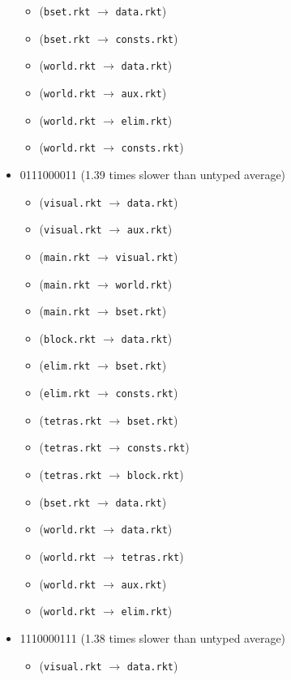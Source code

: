 \documentclass{article}
\newcommand{\mono}[1]{\texttt{#1}}
\begin{document}
\begin{itemize}
\begin{itemize}
  \item (\mono{bset.rkt} $\rightarrow$ \mono{data.rkt})
  \item (\mono{bset.rkt} $\rightarrow$ \mono{consts.rkt})
  \item (\mono{world.rkt} $\rightarrow$ \mono{data.rkt})
  \item (\mono{world.rkt} $\rightarrow$ \mono{aux.rkt})
  \item (\mono{world.rkt} $\rightarrow$ \mono{elim.rkt})
  \item (\mono{world.rkt} $\rightarrow$ \mono{consts.rkt})
  \end{itemize}
\item 0111000011 (1.39 times slower than untyped average)
  \begin{itemize}
  \item (\mono{visual.rkt} $\rightarrow$ \mono{data.rkt})
  \item (\mono{visual.rkt} $\rightarrow$ \mono{aux.rkt})
  \item (\mono{main.rkt} $\rightarrow$ \mono{visual.rkt})
  \item (\mono{main.rkt} $\rightarrow$ \mono{world.rkt})
  \item (\mono{main.rkt} $\rightarrow$ \mono{bset.rkt})
  \item (\mono{block.rkt} $\rightarrow$ \mono{data.rkt})
  \item (\mono{elim.rkt} $\rightarrow$ \mono{bset.rkt})
  \item (\mono{elim.rkt} $\rightarrow$ \mono{consts.rkt})
  \item (\mono{tetras.rkt} $\rightarrow$ \mono{bset.rkt})
  \item (\mono{tetras.rkt} $\rightarrow$ \mono{consts.rkt})
  \item (\mono{tetras.rkt} $\rightarrow$ \mono{block.rkt})
  \item (\mono{bset.rkt} $\rightarrow$ \mono{data.rkt})
  \item (\mono{world.rkt} $\rightarrow$ \mono{data.rkt})
  \item (\mono{world.rkt} $\rightarrow$ \mono{tetras.rkt})
  \item (\mono{world.rkt} $\rightarrow$ \mono{aux.rkt})
  \item (\mono{world.rkt} $\rightarrow$ \mono{elim.rkt})
  \end{itemize}
\item 1110000111 (1.38 times slower than untyped average)
  \begin{itemize}
  \item (\mono{visual.rkt} $\rightarrow$ \mono{data.rkt})

\end{itemize}
\end{itemize}
\end{document}
